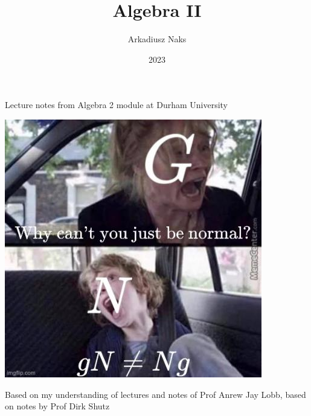 \documentclass[12pt, letterpaper]{article}
\title{Algebra II}
\author{Arkadiusz Naks}
\date{2023}
\begin{document}
\begin{titlepage}
  \begin{center}
    \makeatletter
    \vspace*{1cm}
    \Huge
    \textbf{\@title}

    \vspace{0.5cm}
    \Large
    Lecture notes from Algebra 2 module at Durham University

    \vspace{1.5cm}

    \textbf{\@author}

    \includegraphics[scale=0.55]{algebra.png}
    \vfill

    \vspace{0.8cm}

    \small
    Based on my understanding of lectures and notes of Prof Anrew Jay Lobb,
    based on notes by Prof Dirk Shutz\\
    \@date{}
  \end{center}
\end{titlepage}

\tableofcontents
\newpage
\end{document}

